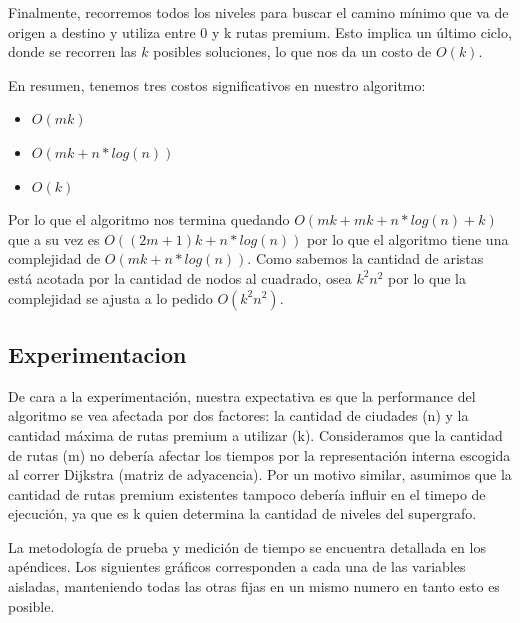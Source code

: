 Finalmente, recorremos todos los niveles para buscar el camino mínimo que va de origen a destino y utiliza entre 0 y k rutas premium. Esto implica un último ciclo, donde se recorren las $k$ posibles soluciones, lo que nos da un costo de $O(k)$.

En resumen, tenemos tres costos significativos en nuestro algoritmo:

\begin{itemize}
	\item $O(mk)$

	\item $O(mk + n * log(n))$

	\item $O(k)$
\end{itemize}

Por lo que el algoritmo nos termina quedando $O(mk + mk + n * log(n) + k)$ que a su vez es $O((2m+1)k + n * log(n))$ por lo que el algoritmo tiene una complejidad de $O(mk + n * log(n))$. Como sabemos la cantidad de aristas está acotada por la cantidad de nodos al cuadrado, osea $k^2n^2$ por lo que la complejidad se ajusta a lo pedido $O(k^2n^2)$.

\subsection{Experimentacion}

De cara a la experimentación, nuestra expectativa es que la performance del algoritmo se vea afectada por dos factores: la cantidad de ciudades (n) y la cantidad máxima de rutas premium a utilizar (k). Consideramos que la cantidad de rutas (m) no debería afectar los tiempos por la representación interna escogida al correr Dijkstra (matriz de adyacencia). Por un motivo similar, asumimos que la cantidad de rutas premium existentes tampoco debería influir en el timepo de ejecución, ya que es k quien determina la cantidad de niveles del supergrafo.

La metodología de prueba y medición de tiempo se encuentra detallada en los apéndices. Los siguientes gráficos corresponden a cada una de las variables aisladas, manteniendo todas las otras fijas en un mismo numero en tanto esto es posible.

